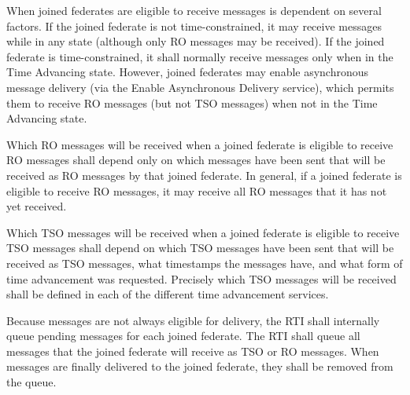 \begin{compactstdpage}
    When joined federates are eligible to receive messages is dependent on several factors. If the joined federate is not time-constrained, it may receive messages while in any state (although only RO messages may be received). If the joined federate is time-constrained, it shall normally receive messages only when in the Time Advancing state. However, joined federates may enable asynchronous message delivery (via the Enable Asynchronous Delivery service), which permits them to receive RO messages (but not TSO messages) when not in the Time Advancing state.

    Which RO messages will be received when a joined federate is eligible to receive RO messages shall depend only on which messages have been sent that will be received as RO messages by that joined federate. In general, if a joined federate is eligible to receive RO messages, it may receive all RO messages that it has not yet received.

    Which TSO messages will be received when a joined federate is eligible to receive TSO messages shall depend on which TSO messages have been sent that will be received as TSO messages, what timestamps the messages have, and what form of time advancement was requested. Precisely which TSO messages will be received shall be defined in each of the different time advancement services.

    Because messages are not always eligible for delivery, the RTI shall internally queue pending messages for each joined federate. The RTI shall queue all messages that the joined federate will receive as TSO or RO messages. When messages are finally delivered to the joined federate, they shall be removed from the queue.


\end{compactstdpage}

\clearpage

\begin{compactstdpage}

    \mbox{}\vfill

\end{compactstdpage}

